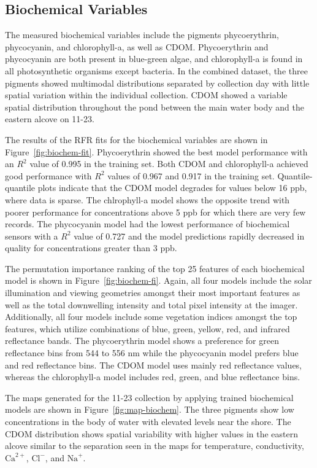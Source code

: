 \documentclass[remotesensing,article,submit,pdftex,moreauthors]{Definitions/mdpi}
\begin{document}
\newpage

\subsection{Biochemical Variables}

The measured biochemical variables include the pigments phycoerythrin, phycocyanin, and chlorophyll-a, as well as CDOM. Phycoerythrin and phycocyanin are both present in blue-green algae, and chlorophyll-a is found in all photosynthetic organisms except bacteria. In the combined dataset, the three pigments showed multimodal distributions separated by collection day with little spatial variation within the individual collection. CDOM showed a variable spatial distribution throughout the pond between the main water body and the eastern alcove on 11-23.

The results of the RFR fits for the biochemical variables are shown in Figure~\ref{fig:biochem-fit}. Phycoerythrin showed the best model performance with an $R^2$ value of 0.995 in the training set. Both CDOM and chlorophyll-a achieved good performance with $R^2$ values of 0.967 and 0.917 in the training set. Quantile-quantile plots indicate that the CDOM model degrades for values below 16 ppb, where data is sparse. The chlrophyll-a model shows the opposite trend with poorer performance for concentrations above 5 ppb for which there are very few records. The phycocyanin model had the lowest performance of biochemical sensors with a $R^2$ value of 0.727 and the model predictions rapidly decreased in quality for concentrations greater than 3 ppb. 

The permutation importance ranking of the top 25 features of each biochemical model is shown in Figure~\ref{fig:biochem-fi}. Again, all four models include the solar illumination and viewing geometries amongst their most important features as well as the total downwelling intensity and total pixel intensity at the imager. Additionally, all four models include some vegetation indices amongst the top features, which utilize combinations of blue, green, yellow, red, and infrared reflectance bands. The phycoerythrin model shows a preference for green reflectance bins from 544 to 556 nm while the phycocyanin model prefers blue and red reflectance bins. The CDOM model uses mainly red reflectance values, whereas the chlorophyll-a model includes red, green, and blue reflectance bins.

The maps generated for the 11-23 collection by applying trained biochemical models are shown in Figure~\ref{fig:map-biochem}. The three pigments show low concentrations in the body of water with elevated levels near the shore. The CDOM distribution shows spatial variability with higher values in the eastern alcove similar to the separation seen in the maps for temperature, conductivity, $\textrm{Ca}^{2+}$, $\textrm{Cl}^{-}$, and $\textrm{Na}^{+}$.
\end{document}
